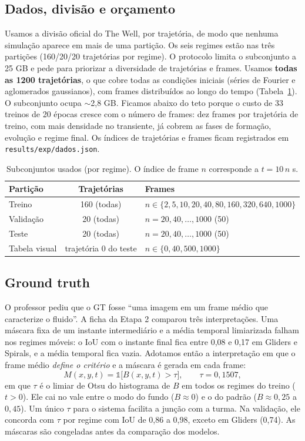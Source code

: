 \subsection{Dados, divisão e orçamento}
Usamos a divisão oficial do The Well, por trajetória, de modo que nenhuma simulação aparece em
mais de uma partição. Os seis regimes estão nas três partições (160/20/20 trajetórias por regime).
O protocolo limita o subconjunto a 25 GB e pede para priorizar a diversidade de trajetórias e
frames. Usamos \textbf{todas as 1200 trajetórias}, o que cobre todas as condições iniciais (séries
de Fourier e aglomerados gaussianos), com frames distribuídos ao longo do tempo
(Tabela~\ref{tab:dados}). O subconjunto ocupa $\sim$2,8 GB. Ficamos abaixo do teto porque o custo de
33 treinos de 20 épocas cresce com o número de frames: dez frames por trajetória de treino, com
mais densidade no transiente, já cobrem as fases de formação, evolução e regime final. Os índices
de trajetórias e frames ficam registrados em \texttt{results/exp/dados.json}.

\begin{table}[t]\centering\small
\caption{Subconjuntos usados (por regime). O índice de frame $n$ corresponde a $t = 10\,n$ s.}
\label{tab:dados}
\begin{tabular}{lcl}
\toprule
Partição & Trajetórias & Frames \\
\midrule
Treino & 160 (todas) & $n\in\{2, 5, 10, 20, 40, 80, 160, 320, 640, 1000\}$ \\
Validação & 20 (todas) & $n = 20, 40, \dots, 1000$ (50) \\
Teste & 20 (todas) & $n = 20, 40, \dots, 1000$ (50) \\
Tabela visual & trajetória 0 do teste & $n\in\{0, 40, 500, 1000\}$ \\
\bottomrule
\end{tabular}
\end{table}

\subsection{Ground truth}
\label{sec:gt}
O professor pediu que o GT fosse ``uma imagem em um frame médio que caracterize o fluido''. A ficha
da Etapa 2 comparou três interpretações. Uma máscara fixa de um instante intermediário e a média
temporal limiarizada falham nos regimes móveis: o IoU com o instante final fica entre 0,08 e 0,17
em Gliders e Spirals, e a média temporal fica vazia. Adotamos então a interpretação em que o frame
médio \emph{define o critério} e a máscara é gerada em cada frame:
\begin{equation}
  M(x,y,t) = \mathbb{1}\big[B(x,y,t) > \tau\big],\qquad \tau = 0{,}1507,
\end{equation}
em que $\tau$ é o limiar de Otsu \cite{otsu1979} do histograma de $B$ em todos os regimes do treino
($t>0$). Ele cai no vale entre o modo do fundo ($B\approx0$) e o do padrão ($B\approx0{,}25$ a
$0{,}45$). Um único $\tau$ para o sistema facilita a junção com a turma. Na validação, ele concorda
com $\tau$ por regime com IoU de 0,86 a 0,98, exceto em Gliders (0,74). As máscaras são congeladas
antes da comparação dos modelos.


